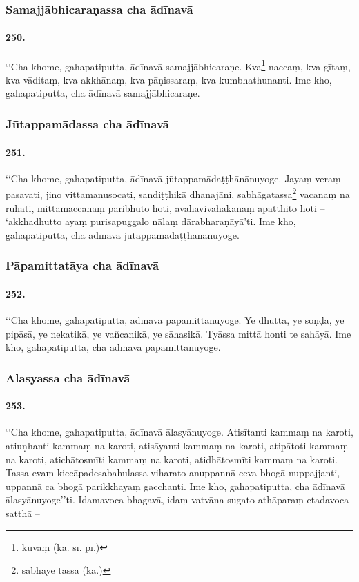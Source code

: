 \subsubsection{Samajjābhicaraṇassa cha ādīnavā}

\paragraph{250.} ‘‘Cha khome, gahapatiputta, ādīnavā samajjābhicaraṇe. Kva\footnote{kuvaṃ (ka. sī. pī.)} naccaṃ, kva gītaṃ, kva vāditaṃ, kva akkhānaṃ, kva pāṇissaraṃ, kva kumbhathunanti. Ime kho, gahapatiputta, cha ādīnavā samajjābhicaraṇe.

\subsubsection{Jūtappamādassa cha ādīnavā}

\paragraph{251.} ‘‘Cha khome, gahapatiputta, ādīnavā jūtappamādaṭṭhānānuyoge. Jayaṃ veraṃ pasavati, jino vittamanusocati, sandiṭṭhikā dhanajāni, sabhāgatassa\footnote{sabhāye tassa (ka.)} vacanaṃ na rūhati, mittāmaccānaṃ paribhūto hoti, āvāhavivāhakānaṃ apatthito hoti – ‘akkhadhutto ayaṃ purisapuggalo nālaṃ dārabharaṇāyā’ti. Ime kho, gahapatiputta, cha ādīnavā jūtappamādaṭṭhānānuyoge.

\subsubsection{Pāpamittatāya cha ādīnavā}

\paragraph{252.} ‘‘Cha khome, gahapatiputta, ādīnavā pāpamittānuyoge. Ye dhuttā, ye soṇḍā, ye pipāsā, ye nekatikā, ye vañcanikā, ye sāhasikā. Tyāssa mittā honti te sahāyā. Ime kho, gahapatiputta, cha ādīnavā pāpamittānuyoge.

\subsubsection{Ālasyassa cha ādīnavā}

\paragraph{253.} ‘‘Cha khome, gahapatiputta, ādīnavā ālasyānuyoge. Atisītanti kammaṃ na karoti, atiuṇhanti kammaṃ na karoti, atisāyanti kammaṃ na karoti, atipātoti kammaṃ na karoti, atichātosmīti kammaṃ na karoti, atidhātosmīti kammaṃ na karoti. Tassa evaṃ kiccāpadesabahulassa viharato anuppannā ceva bhogā nuppajjanti, uppannā ca bhogā parikkhayaṃ gacchanti. Ime kho, gahapatiputta, cha ādīnavā ālasyānuyoge’’ti. Idamavoca bhagavā, idaṃ vatvāna sugato athāparaṃ etadavoca satthā –


